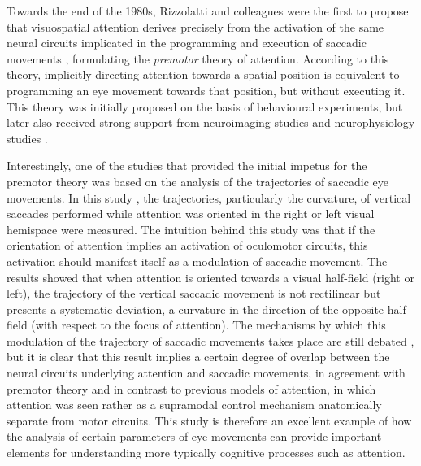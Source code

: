 \documentclass[11pt]{article}
\begin{document}
Towards the end of the 1980s, Rizzolatti and colleagues were the first to propose that visuospatial attention derives precisely from the activation of the same neural circuits implicated in the programming and execution of saccadic movements \cite{Rizzolatti1987}, formulating the \textit{premotor} theory of attention. According to this theory, implicitly directing attention towards a spatial position is equivalent to programming an eye movement towards that position, but without executing it. This theory was initially proposed on the basis of behavioural experiments, but later also received strong support from neuroimaging studies \cite{Corbetta1998} and neurophysiology studies \cite{Moore2001}.

Interestingly, one of the studies that provided the initial impetus for the premotor theory was based on the analysis of the trajectories of saccadic eye movements. In this study \cite{Sheliga1995}, the trajectories, particularly the curvature, of vertical saccades performed while attention was oriented in the right or left visual hemispace were measured. The intuition behind this study was that if the orientation of attention implies an activation of oculomotor circuits, this activation should manifest itself as a modulation of saccadic movement. The results showed that when attention is oriented towards a visual half-field (right or left), the trajectory of the vertical saccadic movement is not rectilinear but presents a systematic deviation, a curvature in the direction of the opposite half-field (with respect to the focus of attention). The mechanisms by which this modulation of the trajectory of saccadic movements takes place are still debated \cite{VanderStigchel2006}, but it is clear that this result implies a certain degree of overlap between the neural circuits underlying attention and saccadic movements, in agreement with premotor theory and in contrast to previous models of attention, in which attention was seen rather as a supramodal control mechanism anatomically separate from motor circuits. This study is therefore an excellent example of how the analysis of certain parameters of eye movements can provide important elements for understanding more typically cognitive processes such as attention.
\end{document}
